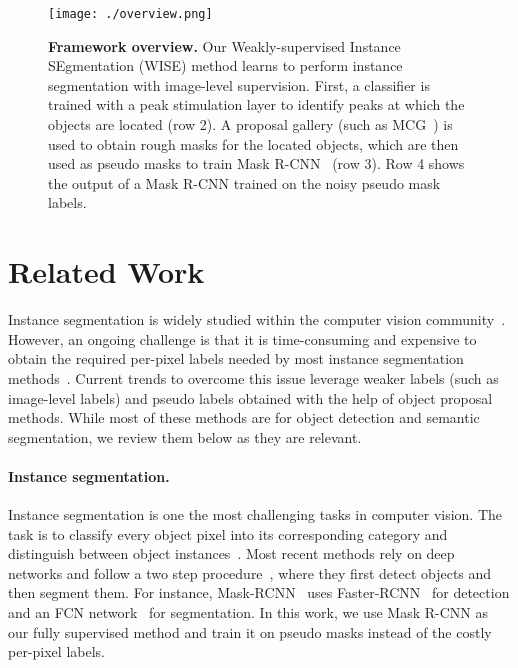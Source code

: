 \documentclass{bmvc2k}
\begin{document}
\begin{figure}[t]
    \centering
    \texttt{[image: ./overview.png]}
    \vspace{-6mm}
    \caption{{\bf Framework overview.} Our Weakly-supervised Instance SEgmentation (WISE) method learns to perform instance segmentation with image-level supervision. First, a classifier is trained with a peak stimulation layer to identify peaks at which the objects are located (row 2). A proposal gallery (such as MCG~\cite{arbelaez2014mcg}) is used to obtain rough masks for the located objects, which are then used as pseudo masks to train Mask R-CNN~\cite{he2017mask} (row 3). Row 4 shows the output of a Mask R-CNN trained on the noisy pseudo mask labels.}
    \label{fig:overview}
\end{figure}















\section{Related Work}
\label{sec:relatedwork}
Instance segmentation is widely studied within the computer vision community~\cite{he2017mask, chen2017masklab, fu2019retinamask}. However, an ongoing challenge is that it is time-consuming and expensive to obtain the required per-pixel labels needed by most instance segmentation methods~\cite{everingham2010pascal, cordts2016cityscapes}. Current trends to overcome this issue leverage weaker labels (such as image-level labels) and pseudo labels obtained with the help of object proposal methods. While most of these methods are for object detection and semantic segmentation, we review them below as they are relevant.




\paragraph{Instance segmentation.}
Instance segmentation is one the most challenging tasks in computer vision. The task is to classify every object pixel into its corresponding category and distinguish between object instances~\cite{ren2017end, romera2016recurrent}. Most recent methods rely on deep networks and follow a two step procedure~\cite{he2017mask, chen2017masklab, fu2019retinamask}, where they first detect objects and then segment them. For instance, Mask-RCNN~\cite{he2017mask} uses Faster-RCNN~\cite{ren2015faster} for detection and an FCN network~\cite{long2015fully} for segmentation. In this work, we use Mask R-CNN as our fully supervised method and train it on pseudo masks instead of the costly per-pixel labels.
\end{document}
